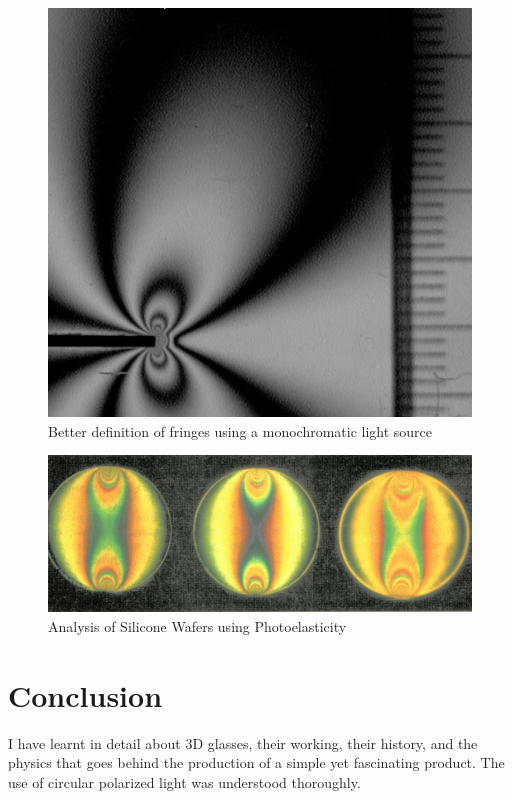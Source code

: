 \documentclass[11pt]{article}
\begin{document}
\begin{figure}[H]
	\centering
	\includegraphics[scale=.5]{mono photo elasticity.jpg}
	\centering
	\caption{Better definition of fringes using a monochromatic light source}
	\label{fig:This figure}
\end{figure}

\begin{figure}[H]
	\centering
	\includegraphics[scale=.4]{si wafer analysis.jpg}
	\centering
	\caption{Analysis of Silicone Wafers using Photoelasticity}
	\label{fig:This figure}
\end{figure}

\section{Conclusion}
I have learnt in detail about 3D glasses, their working, their history, and the physics that goes behind the production of a simple yet fascinating product. The use of circular polarized light was understood thoroughly. \\
\end{document}
